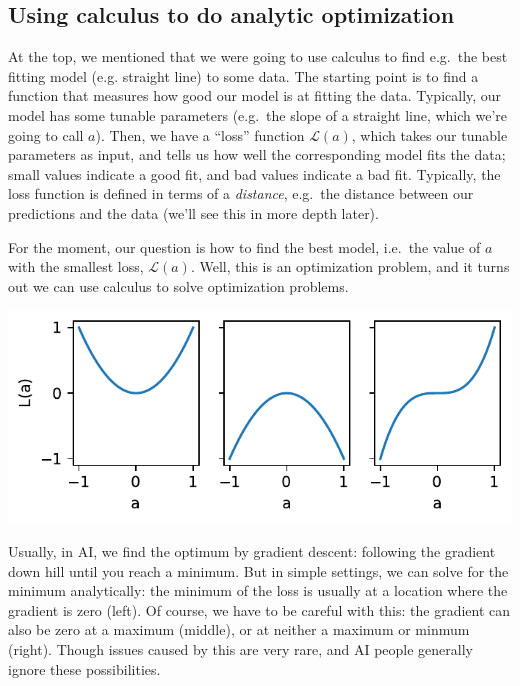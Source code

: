 \documentclass{article}
\renewcommand{\L}{\mathcal{L}}
\begin{document}
\subsection{Using calculus to do analytic optimization}
At the top, we mentioned that we were going to use calculus to find e.g.\ the best fitting model (e.g. straight line) to some data.
The starting point is to find a function that measures how good our model is at fitting the data.
Typically, our model has some tunable parameters (e.g.\ the slope of a straight line, which we're going to call $a$).
Then, we have a ``loss'' function $\L(a)$, which takes our tunable parameters as input, and tells us how well the corresponding model fits the data; small values indicate a good fit, and bad values indicate a bad fit.
Typically, the loss function is defined in terms of a \textit{distance}, e.g.\ the distance between our predictions and the data (we'll see this in more depth later).

For the moment, our question is how to find the best model, i.e.\ the value of $a$ with the smallest loss, $\L(a)$.
Well, this is an optimization problem, and it turns out we can use calculus to solve optimization problems.

\includegraphics{x2x3.pdf}

Usually, in AI, we find the optimum by gradient descent: following the gradient down hill until you reach a minimum.
But in simple settings, we can solve for the minimum analytically: the minimum of the loss is usually at a location where the gradient is zero (left).  Of course, we have to be careful with this: the gradient can also be zero at a maximum (middle), or at neither a maximum or minmum (right).
Though issues caused by this are very rare, and AI people generally ignore these possibilities.
\end{document}
